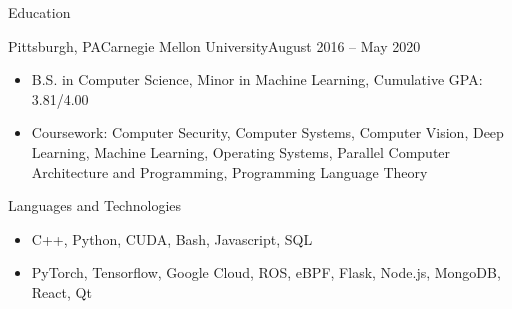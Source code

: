 \documentclass[termes]{resume}
\begin{document}
	\makeheader
	
	\begin{cvsection}{Education}
		\begin{cvsubsection}{Pittsburgh, PA}{Carnegie Mellon University}{August 2016 -- May 2020}
			\begin{itemize}
				\item B.S. in Computer Science, Minor in Machine Learning, Cumulative GPA: 3.81/4.00
				\item Coursework: Computer Security, Computer Systems, Computer Vision, Deep Learning, Machine Learning, Operating Systems, Parallel Computer Architecture and Programming, Programming Language Theory
			\end{itemize}
		\end{cvsubsection}
	\end{cvsection}
		
	\begin{cvsection}{Languages and Technologies}
		\begin{cvsubsection}{}{}{}	
			\begin{itemize}
				\item C++, Python, CUDA, Bash, Javascript, SQL
				\item PyTorch, Tensorflow, Google Cloud, ROS, eBPF, Flask, Node.js, MongoDB, React, Qt
			\end{itemize}
		\end{cvsubsection}
	\end{cvsection}
	
\end{document}
